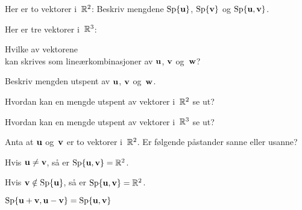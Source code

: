 
\begin{oppgave}
Her er to vektorer i~$\mathbb{R}^2$:
Beskriv mengdene
$\operatorname{Sp} \{ \mathbf{u} \}$,
$\operatorname{Sp} \{ \mathbf{v} \}$ og
$\operatorname{Sp} \{ \mathbf{u}, \mathbf{v} \}$.
\end{oppgave}

\begin{losning}
\end{losning}


\begin{oppgave}
Her er tre vektorer i~$\mathbb{R}^3$:
\begin{punkt}
Hvilke av vektorene
\[
\]
kan skrives som lineærkombinasjoner av $\mathbf{u}$, $\mathbf{v}$ og~$\mathbf{w}$?
\end{punkt}
\begin{punkt}
Beskriv mengden utspent av $\mathbf{u}$, $\mathbf{v}$ og~$\mathbf{w}$.
\end{punkt}
\end{oppgave}

\begin{losning}
\end{losning}


\begin{oppgave}
\begin{punkt}
Hvordan kan en mengde utspent av vektorer i~$\mathbb{R}^2$ se ut?
\end{punkt}
\begin{punkt}
Hvordan kan en mengde utspent av vektorer i~$\mathbb{R}^3$ se ut?
\end{punkt}
\end{oppgave}

\begin{losning}
\end{losning}


\begin{oppgave}
Anta at $\mathbf{u}$ og~$\mathbf{v}$ er to vektorer i~$\mathbb{R}^2$.  Er følgende påstander
sanne eller usanne?
\begin{punkt}
Hvis $\mathbf{u} \ne \mathbf{v}$, så er $\operatorname{Sp} \{ \mathbf{u}, \mathbf{v} \} = \mathbb{R}^2$.
\end{punkt}
\begin{punkt}
Hvis $\mathbf{v} \notin \operatorname{Sp} \{ \mathbf{u} \}$, så er $\operatorname{Sp} \{ \mathbf{u}, \mathbf{v} \} = \mathbb{R}^2$.
\end{punkt}
\begin{punkt}
$\operatorname{Sp} \{ \mathbf{u} + \mathbf{v}, \mathbf{u} - \mathbf{v} \} = \operatorname{Sp} \{ \mathbf{u}, \mathbf{v} \}$
\end{punkt}
\end{oppgave}

\begin{losning}
\end{losning}
